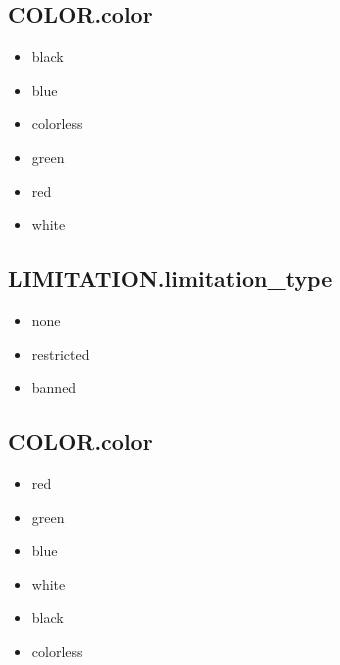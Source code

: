 \documentclass{article}
\begin{document}
\subsection{COLOR.color}
\begin{multicols}{3}
   \begin{itemize}
           \item black
           \item blue
           \item colorless
           \item green 
           \item red
           \item white
   \end{itemize} 
\end{multicols}

\subsection{LIMITATION.limitation\_type}
\begin{multicols}{3}
    \begin{itemize}
        \item none
        \item restricted
        \item banned
    \end{itemize}
\end{multicols}
\subsection{COLOR.color}
\begin{multicols}{3}
    \begin{itemize}
        \item red
        \item green
        \item blue
        \item white
        \item black
        \item colorless
    \end{itemize}
\end{multicols}
\end{document}
